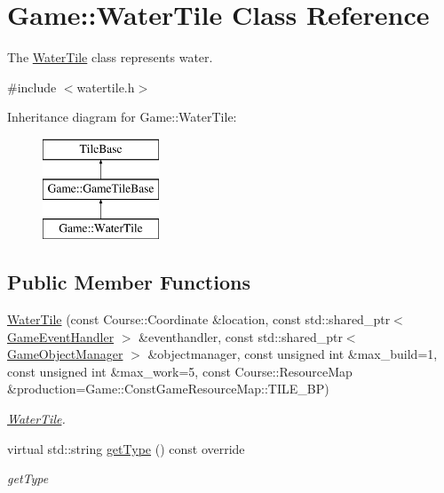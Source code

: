 \hypertarget{class_game_1_1_water_tile}{\section{Game\-:\-:Water\-Tile Class Reference}
\label{class_game_1_1_water_tile}
}


The \hyperlink{class_game_1_1_water_tile}{Water\-Tile} class represents water.  




{\ttfamily \#include $<$watertile.\-h$>$}

Inheritance diagram for Game\-:\-:Water\-Tile\-:\begin{figure}[H]
\begin{center}
\leavevmode
\includegraphics[height=3.000000cm]{class_game_1_1_water_tile}
\end{center}
\end{figure}
\subsection*{Public Member Functions}
\begin{DoxyCompactItemize}
\item 
\hyperlink{class_game_1_1_water_tile_aa32c23d7b999b3a3094f5b5d27f131df}{Water\-Tile} (const Course\-::\-Coordinate \&location, const std\-::shared\-\_\-ptr$<$ \hyperlink{class_game_1_1_game_event_handler}{Game\-Event\-Handler} $>$ \&eventhandler, const std\-::shared\-\_\-ptr$<$ \hyperlink{class_game_1_1_game_object_manager}{Game\-Object\-Manager} $>$ \&objectmanager, const unsigned int \&max\-\_\-build=1, const unsigned int \&max\-\_\-work=5, const Course\-::\-Resource\-Map \&production=Game\-::\-Const\-Game\-Resource\-Map\-::\-T\-I\-L\-E\-\_\-\-B\-P)
\begin{DoxyCompactList}\small\item\em \hyperlink{class_game_1_1_water_tile}{Water\-Tile}. \end{DoxyCompactList}\item 
virtual std\-::string \hyperlink{class_game_1_1_water_tile_ad99fc351f47f0be0120dacecdac11943}{get\-Type} () const override
\begin{DoxyCompactList}\small\item\em get\-Type \end{DoxyCompactList}\end{DoxyCompactItemize}

